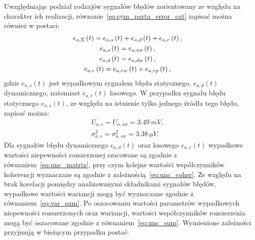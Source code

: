 Uwzględniając podział rodzajów sygnałów błędów zorientowany ze względu na charakter ich realizacji, równanie~\eqref{eq:sym_parta_error_cat} zapisać można również w postaci:
\begin{gather}
e_{a,\Sigma} \left(t\right) = e_{a,s} \left(t\right) + e_{a,d} \left(t\right) + e_{a,r} \left(t\right) \label{eq:sym_parta_error_cat}, \\
e_{a,s} \left(t\right) = e_{a,sw} \left(t\right) \label{eq:sym_parta_error_stat}, \\
e_{a,d} \left(t\right) = e_{a,dw} \left(t\right) \label{eq:sym_parta_error_dyn}, \\
e_{a,r} \left(t\right) = e_{a,rw} \left(t\right) + e_{a,rp} \left(t\right) \label{eq:sym_parta_error_rand},
\end{gather}
gdzie $e_{a,s}(t)$ jest wypadkowym sygnałem błędu statycznego, $e_{a,d}(t)$ dynamicznego, natomiast $e_{a,r}(t)$ losowego. W przypadku sygnału błędu statycznego $e_{a,s}(t)$, ze względu na istnienie tylko jednego źródła tego błędu, zapisać można:
\begin{gather}
U_{a,s} = U_{a,sw} = \qty{3.49}{mV} \label{eq:sym_parta_uncert_stat}, \\
\sigma_{a,s}^{2} = \sigma_{a,sw}^{2} = \qty{3.38}{\micro V} \label{eq:sym_parta_var_stat}.
\end{gather}
Dla sygnałów błędu dynamicznego $e_{a,d}(t)$ oraz losowego $e_{a,r}(t)$ wypadkowe wartości niepewności rozszerzonej szacowane są zgodnie z równaniem~\eqref{eq:unc_matrix}, przy czym kolejne wartości współczynników koherencji wyznaczane są zgodnie z zależnością~\eqref{eq:unc_coher}. Ze względu na brak korelacji pomiędzy analizowanymi składnikami sygnałów błędów, wypadkowe wartości wariancji mogą być wyznaczane zgodnie z równaniem~\eqref{eq:var_sum}. Po oszacowaniu wartości parametrów wypadkowych niepewności rozszerzonych oraz wariancji, wartości współczynników rozszerzenia mogą być oszacowane zgodnie z równaniem~\eqref{eq:unc_sum}. Wymienione zależności przyjmują w bieżącym przypadku postać:
